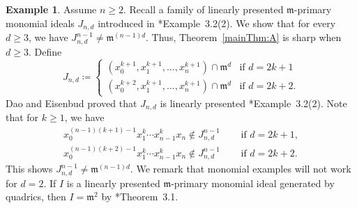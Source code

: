 \documentclass[11pt,letterpaper,reqno]{amsart}
\newcommand{\m}{\mathfrak{m}}
\theoremstyle{definition}
\newtheorem{example}[theorem]{Example}
\numberwithin{equation}{section}
\begin{document}
\begin{example}\label{ex:sharp>2}
    Assume $n \ge 2$. Recall a family of linearly presented $\m$-primary monomial ideals $J_{n,d}$ introduced in \cite{DaoEisenbud}*{Example~3.2(2)}. We show that for every $d \ge 3$, we have $J_{n,d}^{n-1} \ne \m^{(n-1)d}$. Thus, Theorem~\ref{mainThm:A} is sharp when $d \ge 3$. Define
    \[J_{n,d} \coloneqq \begin{cases}
        (x_0^{k+1},x_1^{k+1},\dots,x_n^{k+1}) \cap \m^{d} &\text{if }d=2k+1\\
        (x_0^{k+2},x_1^{k+1},\dots,x_n^{k+1}) \cap \m^{d} &\text{if }d=2k+2.
    \end{cases}\]
    Dao and Eisenbud proved that $J_{n,d}$ is linearly presented \cite{DaoEisenbud}*{Example~3.2(2)}. Note that for $k\ge 1$, we have
    \begin{align*}
        x_0^{(n-1)(k+1)-1} x_1^k \cdots x_{n-1}^kx_n \notin J_{n,d}^{n-1} &\quad\text{ if }d=2k+1,\\
        x_0^{(n-1)(k+2)-1} x_1^k \cdots x_{n-1}^kx_n \notin J_{n,d}^{n-1} &\quad\text{ if }d=2k+2.
    \end{align*}
    This shows $J_{n,d}^{n-1} \ne \m^{(n-1)d}$. We remark that monomial examples will not work for $d = 2$. If $I$ is a linearly presented $\m$-primary monomial ideal generated by quadrics, then $I = \m^2$ by \cite{DaoEisenbud}*{Theorem~3.1}.
\end{example}
\end{document}
